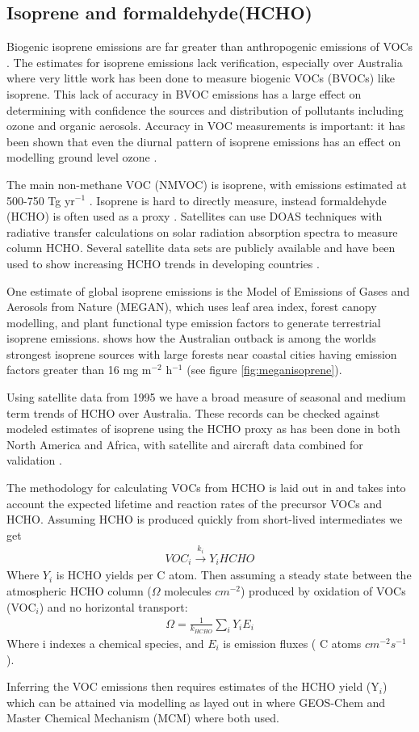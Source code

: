 \subsection{Isoprene and formaldehyde(HCHO)}

Biogenic isoprene emissions are far greater than anthropogenic emissions of VOCs \cite{Guenther_2006}. 
The estimates for isoprene emissions lack verification, especially over Australia where very little work has been done to measure biogenic VOCs (BVOCs) like isoprene.
This lack of accuracy in BVOC emissions has a large effect on determining with confidence the sources and distribution of pollutants including ozone and organic aerosols.
Accuracy in VOC measurements is important: it has been shown that even the diurnal pattern of isoprene emissions has an effect on modelling ground level ozone \cite{Hewitt_2011,Fan_2004}.

The main non-methane VOC (NMVOC) is isoprene, with emissions estimated at 500-750 Tg yr$^{-1}$ \cite{Guenther_2006}.
Isoprene is hard to directly measure, instead formaldehyde (HCHO) is often used as a proxy \cite{Marais_2012,bauwens2013satellite}.
Satellites can use DOAS techniques with radiative transfer calculations on solar radiation absorption spectra to measure column HCHO.
Several satellite data sets are publicly available and have been used to show increasing HCHO trends in developing countries \cite{Mahajan_2015}.

One estimate of global isoprene emissions is the Model of Emissions of Gases and Aerosols from Nature (MEGAN), which uses leaf area index, forest canopy modelling, and plant functional type emission factors to generate terrestrial isoprene emissions.
\citet{Guenther_2006} shows how the Australian outback is among the worlds strongest isoprene sources with large forests near coastal cities having emission factors greater than 16 mg m$^{-2}$ h$^{-1}$ (see figure \ref{fig:meganisoprene}).

Using satellite data from 1995 we have a broad measure of seasonal and medium term trends of HCHO over Australia.
These records can be checked against modeled estimates of isoprene using the HCHO proxy as has been done in both North America and Africa, with satellite and aircraft data combined for validation \cite{Millet_2006, Marais_2014}.

The methodology for calculating VOCs from HCHO is laid out in \citet{Palmer_2003} and takes into account the expected lifetime and reaction rates of the precursor VOCs and HCHO.
Assuming HCHO is produced quickly from short-lived intermediates we get
\begin{eqnarray*}
VOC_i \overset{k_i}{\rightarrow} Y_i HCHO
\end{eqnarray*}
Where $Y_i$ is HCHO yields per C atom.
Then assuming a steady state between the atmospheric HCHO column ($\Omega$ molecules $cm^{-2}$)  produced by oxidation of VOCs (VOC$_i$) and no horizontal transport:
\begin{eqnarray*}
\Omega = \frac{1}{k_{HCHO}} \sum_{i} Y_i E_i
\end{eqnarray*}
Where i indexes a chemical species, and $E_i$ is emission fluxes ( C atoms $cm^{-2}s^{-1}$).

Inferring the VOC emissions then requires estimates of the HCHO yield (Y$_i$) which can be attained via modelling as layed out in \citet{Millet_2006} where GEOS-Chem and Master Chemical Mechanism (MCM) where both used.

